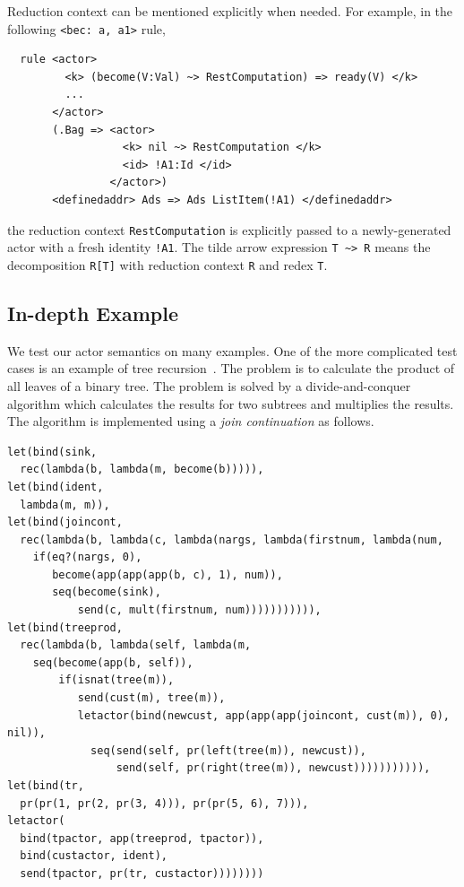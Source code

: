 \documentclass{llncs}
\begin{document}
Reduction context can be mentioned explicitly when needed.
For example, in the following \texttt{<bec: a, a1>} rule,
\small
\begin{verbatim}
  rule <actor>
         <k> (become(V:Val) ~> RestComputation) => ready(V) </k>
         ...
       </actor>
       (.Bag => <actor>
                  <k> nil ~> RestComputation </k>
                  <id> !A1:Id </id>
                </actor>)
       <definedaddr> Ads => Ads ListItem(!A1) </definedaddr>
\end{verbatim}
\normalsize
the reduction context \texttt{RestComputation} is explicitly passed to a 
newly-generated actor with a fresh identity \verb|!A1|.
The tilde arrow expression \verb|T ~> R| 
means the decomposition \verb|R[T]| with reduction context \texttt{R} and redex 
\texttt{T}.

\subsection{In-depth Example}
We test our actor semantics on many examples. One of the more complicated test
cases is an example of tree recursion~\cite{actor}.  The problem is to calculate
the product of all leaves of a binary tree.  The problem is solved by a
divide-and-conquer algorithm which calculates the results for two subtrees and
multiplies the results.  The algorithm is implemented using a
\emph{join continuation} as follows.
\small
\begin{verbatim}
let(bind(sink,
  rec(lambda(b, lambda(m, become(b))))),
let(bind(ident,
  lambda(m, m)),
let(bind(joincont,
  rec(lambda(b, lambda(c, lambda(nargs, lambda(firstnum, lambda(num,
    if(eq?(nargs, 0),
       become(app(app(app(b, c), 1), num)),
       seq(become(sink),
           send(c, mult(firstnum, num))))))))))),
let(bind(treeprod,
  rec(lambda(b, lambda(self, lambda(m,
    seq(become(app(b, self)),
        if(isnat(tree(m)),
           send(cust(m), tree(m)),
           letactor(bind(newcust, app(app(app(joincont, cust(m)), 0), nil)),
             seq(send(self, pr(left(tree(m)), newcust)),
                 send(self, pr(right(tree(m)), newcust))))))))))),
let(bind(tr, 
  pr(pr(1, pr(2, pr(3, 4))), pr(pr(5, 6), 7))),
letactor(
  bind(tpactor, app(treeprod, tpactor)),
  bind(custactor, ident),
  send(tpactor, pr(tr, custactor))))))))
\end{verbatim}
\normalsize
\end{document}
